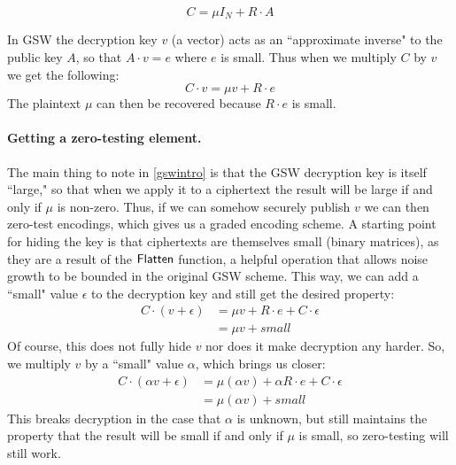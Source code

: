 $$C = \mu I_N + R\cdot A$$

In GSW the decryption key $v$ (a vector) acts as an ``approximate inverse" to the public key $A$, so that $A\cdot v = e$ where $e$ is small.  Thus when we multiply $C$ by $v$ we get the following:
\begin{equation}
\label{gswintro}
C\cdot v = \mu v + R\cdot e
\end{equation}
The plaintext $\mu$ can then be recovered because $R\cdot e$ is small.    

\paragraph{Getting a zero-testing element.}
The main thing to note in \eqref{gswintro} is that the GSW decryption key is itself ``large," so that when we apply it to a ciphertext the result will be large if and only if $\mu$ is non-zero.  Thus, if we can somehow securely publish $v$ we can then zero-test encodings, which gives us a graded encoding scheme.  A starting point for hiding the key is that ciphertexts are themselves small (binary matrices), as they are a result of the $\mathsf{Flatten}$ function, a helpful operation that allows noise growth to be bounded in the original GSW scheme.  This way, we can add a ``small" value $\epsilon$ to the decryption key and still get the desired property:
\begin{align*}
C\cdot(v + \epsilon) &= \mu v + R\cdot e + C\cdot \epsilon \\
&= \mu v + small
\end{align*}
Of course, this does not fully hide $v$ nor does it make decryption any harder.  So, we multiply $v$ by a ``small" value $\alpha$, which brings us closer:
\begin{align*}
C\cdot(\alpha v + \epsilon) &= \mu (\alpha v) + \alpha R\cdot e + C\cdot \epsilon \\
&= \mu (\alpha v) + small
\end{align*}
This breaks decryption in the case that $\alpha$ is unknown, but still maintains the property that the result will be small if and only if $\mu$ is small, so zero-testing will still work.